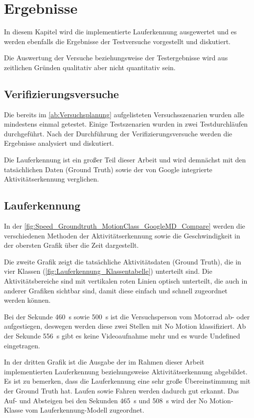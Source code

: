 \chapter{Ergebnisse}

In diesem Kapitel wird die implementierte Lauferkennung ausgewertet und es werden ebenfalls die Ergebnisse der Testversuche vorgestellt und diskutiert.

Die Auswertung der Versuche beziehungsweise der Testergebnisse wird aus zeitlichen Gründen qualitativ aber nicht quantitativ sein.


\section{Verifizierungsversuche}

Die bereits im \autoref{ab:Versuchsplanung} aufgelisteten Versuchsszenarien wurden alle mindestens einmal getestet. Einige Testszenarien wurden in zwei Testdurchläufen durchgeführt.
Nach der Durchführung der Verifizierungsversuche werden die Ergebnisse analysiert und diskutiert. 

Die Lauferkennung ist ein großer Teil dieser Arbeit und wird demnächst mit den tatsächlichen Daten (Ground Truth) sowie der von Google integrierte Aktivitäts\-erkennung verglichen.
\section{Lauferkennung}

In der \autoref{fig:Speed_Groundtruth_MotionClass_GoogleMD_Compare} werden die verschiedenen Methoden der Aktivitätserkennung sowie die Geschwindigkeit in der obersten Grafik über die Zeit dargestellt.

Die zweite Grafik zeigt die tatsächliche Aktivitätsdaten (Ground Truth), die in vier Klassen (\autoref{fig:Lauferkennung_Klassentabelle}) unterteilt sind. Die Aktivitätsbereiche sind mit vertikalen roten Linien optisch unterteilt, die auch in anderer Grafiken sichtbar sind, damit diese einfach und schnell zugeordnet werden können. 

Bei der Sekunde \SI{460}{\second} sowie \SI{500}{\second} ist die Versuchsperson vom Motorrad ab- oder aufgestiegen, deswegen werden diese zwei Stellen mit \glqq No Motion\grqq{} klassifiziert. Ab der Sekunde \SI{556}{\second} gibt es keine Videoaufnahme mehr und es wurde \glqq Undefined\grqq{} eingetragen.

In der dritten Grafik ist die Ausgabe der im Rahmen dieser Arbeit implementierten Lauferkennung beziehungsweise Aktivitätserkennung abgebildet. 
Es ist zu bemerken, dass die Lauferkennung eine sehr große Übereinstimmung mit der Ground Truth hat. Laufen sowie Fahren werden dadurch gut erkannt. Das Auf- und Absteigen bei den Sekunden \SI{465}{\second} und \SI{508}{\second} wird der \glqq No Motion\grqq{}-Klasse vom Lauferkennung-Modell zugeordnet.

